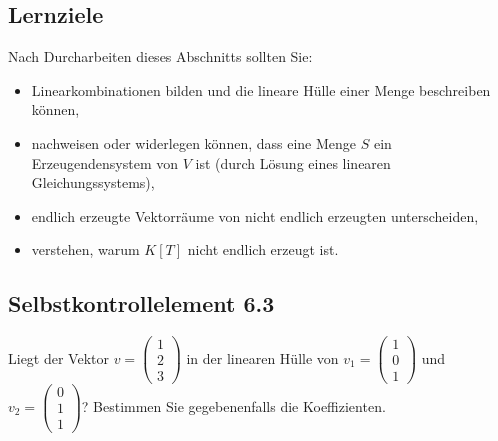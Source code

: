 \documentclass[a4paper,12pt]{article}
\begin{document}
\subsection*{Lernziele}

Nach Durcharbeiten dieses Abschnitts sollten Sie:
\begin{itemize}
  \item Linearkombinationen bilden und die lineare Hülle einer Menge beschreiben können,
  \item nachweisen oder widerlegen können, dass eine Menge $S$ ein Erzeugendensystem
        von $V$ ist (durch Lösung eines linearen Gleichungssystems),
  \item endlich erzeugte Vektorräume von nicht endlich erzeugten unterscheiden,
  \item verstehen, warum $K[T]$ nicht endlich erzeugt ist.
\end{itemize}

\subsection*{Selbstkontrollelement 6.3}

Liegt der Vektor $v = \begin{pmatrix} 1 \\ 2 \\ 3 \end{pmatrix}$ in der linearen Hülle von
$v_1 = \begin{pmatrix} 1 \\ 0 \\ 1 \end{pmatrix}$ und $v_2 = \begin{pmatrix} 0 \\ 1 \\ 1 \end{pmatrix}$?
Bestimmen Sie gegebenenfalls die Koeffizienten.
\end{document}
